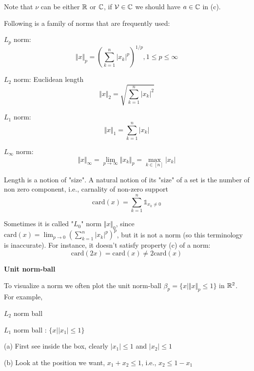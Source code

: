 Note that $\nu$ can be either $\mathbb{R}$ or $\mathbb{C}$, if $\cal{V}\in\mathbb{C}$ we should have $a\in\mathbb{C}$ in (c).

\vspace{0.5cm}
Following is a family of norms that are frequently used:

$L_{p}$ norm:
$$\Vert x\Vert_{p}=(\sum_{k=1}^{n}\vert x_{k}\vert^{p})^{1/p}, 1\leq p\leq\infty$$

$L_{2}$ norm: Euclidean length
$$\Vert x\Vert_{2}=\sqrt{\sum_{k=1}^{n}\vert x_{k}\vert^{2}}$$

$L_{1}$ norm:
$$\Vert x\Vert_{1}=\sum_{k=1}^{n}\vert x_{k}\vert$$

$L_{\infty}$ norm:
$$\Vert x\Vert_{\infty}=\lim_{p\to\infty}\Vert x_{k}\Vert_{p}=\max_{k\in [n]} \vert x_{k}\vert$$

\vspace{0.5cm}
Length is a notion of "size". A natural notion of its "size" of a set is the number of non zero component, i.e., carnality of non-zero support
$$\text{card}(x)=\sum_{k=1}^{n}\mathbb{1}_{x_{k}\neq 0}$$

Sometimes it is called "$L_{0}$" norm $\Vert x\Vert_{0}$, since $\text{card}(x)=\lim_{p\to 0}(\sum_{k=1}^{n}\vert x_{k}\vert^{p})^{p}$, but it is not a norm (so this terminology is inaccurate). For instance, it doesn't satisfy property (c) of a norm:
$$\text{card}(2x)=\text{card}(x)\neq 2\text{card}(x)$$

\textbf{Unit norm-ball}

To visualize a norm we often plot the unit norm-ball $\beta_{p}=\{x|\Vert x\Vert_{p}\leq 1\}$ in $\mathbb{R}^{2}$. For example,

\vspace{0.3cm}
$L_{2}$ norm ball

\begin{figure}
	\centering
	\resizebox{7.5cm}{3cm}{}
	\label{}
\end{figure}

$L_{1}$ norm ball : $\{x|\vert x_{1}\vert\leq 1\}$

\begin{figure}
	\centering
	\resizebox{7.5cm}{3cm}{}
	\label{}
\end{figure}

(a) First see inside the box, clearly $\vert x_{1}\vert\leq 1$ and $\vert x_{2}\vert\leq 1$

(b) Look at the position we want, $x_{1}+x_{2}\leq 1$, i.e., $x_{2}\leq 1-x_{1}$

